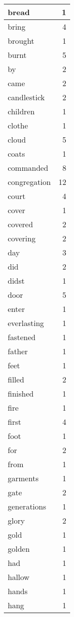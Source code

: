 \begin{center}
\begin{longtable}{l|r}
bread & 1 \\ \hline
bring & 4 \\ \hline
brought & 1 \\ \hline
burnt & 5 \\ \hline
by & 2 \\ \hline
came & 2 \\ \hline
candlestick & 2 \\ \hline
children & 1 \\ \hline
clothe & 1 \\ \hline
cloud & 5 \\ \hline
coats & 1 \\ \hline
commanded & 8 \\ \hline
congregation & 12 \\ \hline
court & 4 \\ \hline
cover & 1 \\ \hline
covered & 2 \\ \hline
covering & 2 \\ \hline
day & 3 \\ \hline
did & 2 \\ \hline
didst & 1 \\ \hline
door & 5 \\ \hline
enter & 1 \\ \hline
everlasting & 1 \\ \hline
fastened & 1 \\ \hline
father & 1 \\ \hline
feet & 1 \\ \hline
filled & 2 \\ \hline
finished & 1 \\ \hline
fire & 1 \\ \hline
first & 4 \\ \hline
foot & 1 \\ \hline
for & 2 \\ \hline
from & 1 \\ \hline
garments & 1 \\ \hline
gate & 2 \\ \hline
generations & 1 \\ \hline
glory & 2 \\ \hline
gold & 1 \\ \hline
golden & 1 \\ \hline
had & 1 \\ \hline
hallow & 1 \\ \hline
hands & 1 \\ \hline
hang & 1 \\ \hline

\end{longtable}
\end{center}
